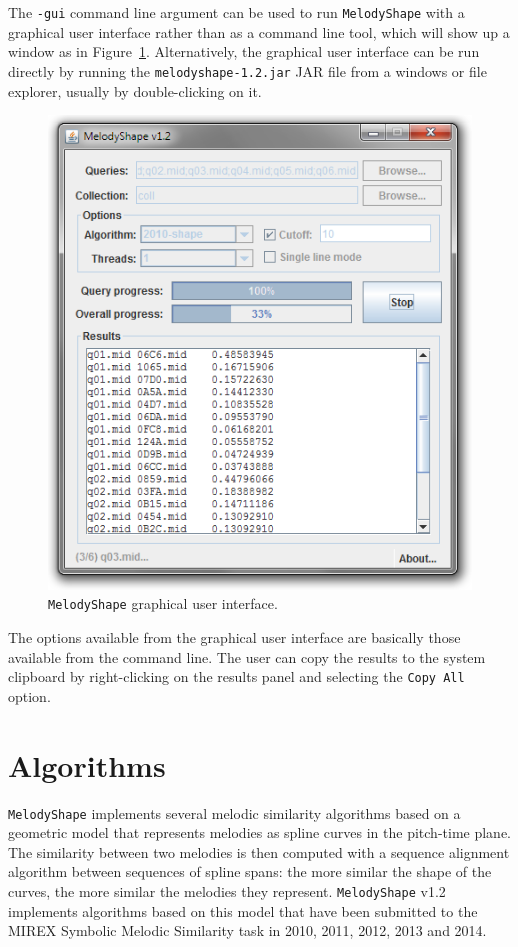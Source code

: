 \documentclass[twoside]{article}
\begin{document}
The \texttt{-gui} command line argument can be used to run \texttt{MelodyShape} with a graphical user interface rather than as a command line tool, which will show up a window as in Figure~\ref{fig:gui}. Alternatively, the graphical user interface can be run directly by running the \texttt{melodyshape-1.2.jar} JAR file from a windows or file explorer, usually by double-clicking on it.
\begin{figure}[!h]
\centering\includegraphics[scale=.6]{gui.png}
\caption{\texttt{MelodyShape} graphical user interface.}
\label{fig:gui}
\end{figure}

The options available from the graphical user interface are basically those available from the command line. The user can copy the results to the system clipboard by right-clicking on the results panel and selecting the \texttt{Copy All} option.

\section{Algorithms}

\texttt{MelodyShape} implements several melodic similarity algorithms based on a geometric model that represents melodies as spline curves in the pitch-time plane. The similarity between two melodies is then computed with a sequence alignment algorithm between sequences of spline spans: the more similar the shape of the curves, the more similar the melodies they represent. \texttt{MelodyShape} v1.2 implements algorithms based on this model that have been submitted to the MIREX Symbolic Melodic Similarity task in 2010, 2011, 2012, 2013 and 2014. 
\end{document}
